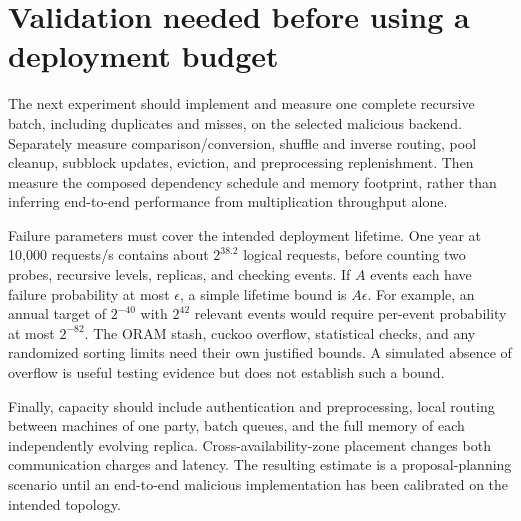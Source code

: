 \section{Validation needed before using a deployment budget}

The next experiment should implement and measure one complete recursive
batch, including duplicates and misses, on the selected malicious backend.
Separately measure comparison/conversion, shuffle and inverse routing, pool
cleanup, subblock updates, eviction, and preprocessing replenishment. Then
measure the composed dependency schedule and memory footprint, rather than
inferring end-to-end performance from multiplication throughput alone.

Failure parameters must cover the intended deployment lifetime. One year at
10,000 requests/s contains about $2^{38.2}$ logical requests, before counting
two probes, recursive levels, replicas, and checking events. If $A$ events
each have failure probability at most $\epsilon$, a simple lifetime bound is
$A\epsilon$. For example, an annual target of $2^{-40}$ with $2^{42}$
relevant events would require per-event probability at most $2^{-82}$.
The ORAM stash, cuckoo overflow, statistical checks, and any randomized
sorting limits need their own justified bounds. A simulated absence of
overflow is useful testing evidence but does not establish such a bound.

Finally, capacity should include authentication and preprocessing, local
routing between machines of one party, batch queues, and the full memory of
each independently evolving replica. Cross-availability-zone placement
changes both communication charges and latency. The resulting estimate is a
proposal-planning scenario until an end-to-end malicious implementation has
been calibrated on the intended topology.
